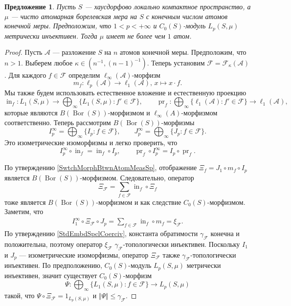 \documentclass[12pt]{article}
\newtheorem{proposition}[theorem]{Предложение}
\begin{document}
\begin{proposition}\label{MetInjC0SModLpSmuOnFinAtmMeasSpCharac}
    Пусть $S$ --- хаусдорфово локально компактное пространство, а $\mu$ --- 
    чисто атомарная борелевская мера на $S$ с конечным числом атомов конечной 
    меры. Предположим, что $1<p<+\infty$ и $C_0(S)$-модуль $L_p(S,\mu)$ 
    метрически инъективен. Тогда $\mu$ имеет не более чем $1$ атом.
\end{proposition}
\begin{proof}
    Пусть $\mathcal{A}$ --- разложение $S$ на $n$ атомов конечной меры. 
    Предположим, что $n>1$. Выберем любое $\kappa\in(n^{-1}, (n-1)^{-1})$. 
    Теперь установим $\mathcal{F}=\mathcal{F}_{\kappa}(\mathcal{A})$. Для 
    каждого $f\in \mathcal{F}$ определим $\ell_\infty(\mathcal{A})$-морфизм 
    \[
        m_f:
        \ell_p(\mathcal{A})\to\ell_1(\mathcal{A}),\,
        x\mapsto x\cdot f.
    \]
    Мы также будем использовать естественное вложение и естественную проекцию
    \[
        \operatorname{in}_f:
        L_1(S,\mu)\to\bigoplus_\infty\{L_1(S,\mu):f'\in\mathcal{F}\},
        \qquad
        \operatorname{pr}_f:
        \bigoplus_\infty\{
            \ell_1(\mathcal{A}):f'\in\mathcal{F}
        \}\to\ell_1(\mathcal{A}),
    \]
    которые являются $B(\operatorname{Bor}(S))$-морфизмом 
    и $\ell_\infty(A)$-морфизмом соответственно. Теперь 
    рассмотрим $B(\operatorname{Bor}(S))$-морфизмы 
    \[
        I_p^\infty=\bigoplus_\infty\{I_p:f\in\mathcal{F}\},
        \qquad
        J_p^\infty=\bigoplus_\infty\{J_p:f\in\mathcal{F}\}.
    \]
    Это изометрические изоморфизмы и легко проверить, что 
    \[
        I_p^\infty \circ \operatorname{in}_f=\operatorname{in}_f\circ I_p,
        \qquad 
        \operatorname{pr}_f\circ I_p^\infty=I_p\circ \operatorname{pr}_f.
    \]

    По утверждению \ref{SwtchMorphBtwnAtomMeasSp}, 
    отображение $\Xi_f=J_1\circ m_f\circ I_p$ 
    является $B(\operatorname{Bor}(S))$-морфизмом. Следовательно, оператор 
    \[
        \Xi_{\mathcal{F}}=\sum_{f\in\mathcal{F}}\operatorname{in}_f\circ \Xi_f
    \]
    тоже является $B(\operatorname{Bor}(S))$-морфизмом и как 
    следствие $C_0(S)$-морфизмом. Заметим, что
    \[
    \begin{aligned}
        I_1^\infty\circ\Xi_\mathcal{F}\circ J_p
        = \sum_{f\in\mathcal{F}} 
            \operatorname{in}_f\circ m_f 
        =\xi_{\mathcal{F}}.
    \end{aligned}
    \]
    По утверждению \ref{StdEmbdSpclCoerciv}, константа 
    обратимости $\gamma_{\mathcal{F}}$ конечна и положительна, 
    поэтому оператор $\xi_{\mathcal{F}}$ $\gamma_{\mathcal{F}}$-топологически 
    инъективен. Поскольку $I_1$ и $J_p$ --- изометрические изоморфизмы, 
    оператор $\Xi_{\mathcal{F}}$ также $\gamma_{\mathcal{F}}$-топологически 
    инъективен. По предположению, $C_0(S)$-модуль $L_p(S,\mu)$ 
    метрически инъективен, значит существует $C_0(S)$-морфизм 
    \[
        \Psi:
        \bigoplus_\infty\{ L_1(S,\mu):f\in\mathcal{F}\}\to L_p(S,\mu)
    \]
    такой, что $\Psi\circ \Xi_{\mathcal{F}}=1_{L_p(S,\mu)}$ 
    и $\Vert \Psi\Vert\leq \gamma_{\mathcal{F}}$.


\end{proof}
\end{document}
